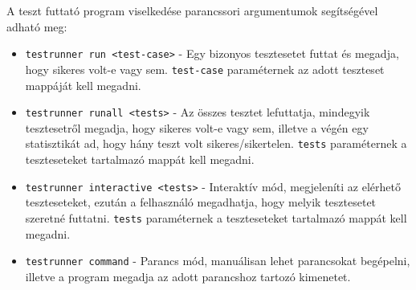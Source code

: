 A teszt futtató program viselkedése parancssori argumentumok segítségével adható meg: 
\begin{itemize}
    \item \texttt{testrunner run <test-case>} - Egy bizonyos tesztesetet futtat és megadja, hogy sikeres volt-e vagy sem. \texttt{test-case} paraméternek az adott teszteset mappáját kell megadni.
    \item \texttt{testrunner runall <tests>} - Az összes tesztet lefuttatja, mindegyik tesztesetről megadja, hogy sikeres volt-e vagy sem, illetve a végén egy statisztikát ad, hogy hány teszt volt sikeres/sikertelen. \texttt{tests} paraméternek a teszteseteket tartalmazó mappát kell megadni.
    \item \texttt{testrunner interactive <tests>} - Interaktív mód, megjeleníti az elérhető teszteseteket, ezután a felhasználó megadhatja, hogy melyik tesztesetet szeretné futtatni. \texttt{tests} paraméternek a teszteseteket tartalmazó mappát kell megadni.
    \item \texttt{testrunner command} - Parancs mód, manuálisan lehet parancsokat begépelni, illetve a program megadja az adott parancshoz tartozó kimenetet.
\end{itemize}
